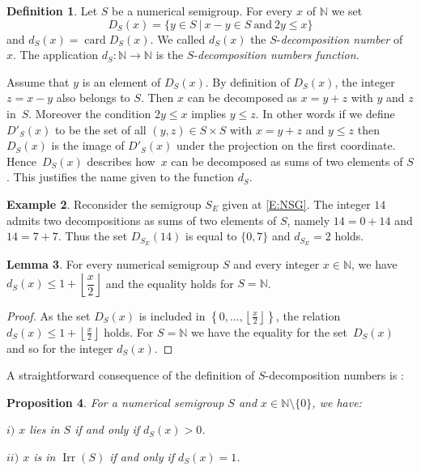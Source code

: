 \documentclass[reqno]{amsart}
\theoremstyle{plain}
\newtheorem{prop}{Proposition}[section]
\theoremstyle{definition}
\newtheorem{defi}[prop]{Definition}
\newtheorem{exam}[prop]{Example}
\newtheorem{lem}[prop]{Lemma}
\renewcommand{\leq}{\leqslant}
\newcommand{\NN}{\mathbb{N}}
\DeclareMathOperator{\Irr}{Irr}
\DeclareMathOperator{\card}{card}
\begin{document}
\begin{defi}
Let $S$ be a numerical semigroup.
For every $x$ of $\NN$  we set
\[
D_S(x)=\{y \in S\ |\ x-y\in S\ \text{and}\ 2y\leq x\}
\]
and $d_S(x)=\card D_S(x)$.
We called $d_S(x)$ the $S$-\emph{decomposition number} of~$x$.
The application $d_S:\NN\to\NN$ is the $S$-\emph{decomposition numbers function}.
\end{defi}

Assume that $y$ is an element of $D_S(x)$.
By definition of $D_S(x)$, the integer~$z=x-y$ also belongs to $S$. 
Then $x$ can be decomposed as $x=y+z$ with $y$ and $z$ in~$S$. 
Moreover the condition $2y\leq x$ implies $y\leq z$. 
In other words if we define~$D'_S(x)$ to be the set of all $(y,z)\in S\times S$ with $x=y+z$ and $y\leq z$ then~$D_S(x)$ is the image of $D'_S(x)$ under the projection on the first coordinate.
 Hence~$D_S(x)$ describes how~$x$ can be decomposed as sums of two elements of $S$.
 This justifies the name given to the function $d_S$.
 
\begin{exam}
Reconsider the semigroup $S_E$ given at \eqref{E:NSG}.
The integer $14$ admits two decompositions as sums of two elements of $S$, namely $14=0+14$ and $14=7+7$. 
Thus the set $D_{S_E}(14)$ is equal to $\{0,7\}$ and $d_{S_E}=2$ holds.
\end{exam}


\begin{lem}
\label{L:RepN}
For every numerical semigroup $S$ and every integer $x\in \NN$,  we have $d_S(x)\leq 1+\left\lfloor \dfrac{x}2\right\rfloor$ and the equality holds for $S=\NN$.
\end{lem}

\begin{proof}
As the set $D_S(x)$ is included in $\left\{0,...,\left\lfloor\frac x2\right\rfloor\right\}$, the relation $d_S(x)\leq 1+\left\lfloor \frac{x}2\right\rfloor$ holds.
For $S=\NN$ we have the equality for the set~$D_S(x)$ and so for the integer $d_S(x)$.
\end{proof}

A straightforward consequence of the definition of $S$-decomposition numbers is :


\begin{prop}
\label{P:Dandd}
For a numerical semigroup $S$ and $x\in\NN\setminus\{0\}$, we have:

 $i)$ $x$ lies in $S$ if and only if $d_S(x)>0$.

 $ii)$ $x$ is in $\Irr(S)$ if and only if $d_S(x)=1$.
\end{prop}
\end{document}
